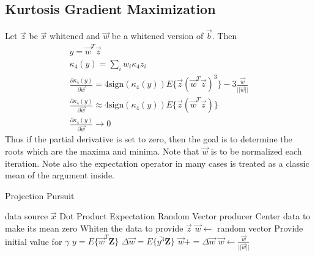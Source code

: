 \documentclass[12pt ]{article}
\begin{document}
\subsection{Kurtosis Gradient Maximization}
Let $\vec{z}$ be $\vec{x}$ whitened and $\vec{w}$ be a whitened version of $\vec{b}$.  Then 
\begin{eqnarray}
y = \vec{w}^T \vec{z} \\ 
\kappa_4 (y) = \sum _i w_i \kappa_4{z_i} \\
\frac{\partial \kappa _4 (y)} {\partial \vec{w}} = 4 \textrm{sign} (\kappa _4 (y))E\{ \vec{z} (\vec{w}^T \vec{z})^3\} - 3 \frac{\vec{w}}{||\vec{w}||}  \\
\frac{\partial \kappa _4 (y)} {\partial \vec{w}} \approx 4 \textrm{sign} (\kappa_4(y))E \{ \vec{z} (\vec{w}^T \vec{z}) \} \\
\frac{\partial \kappa _4 (y)} {\partial \vec{w}} \to 0 
\end{eqnarray}
Thus if the partial derivative is set to zero, then the goal is to determine the roots which are the maxima and minima.  Note that $\vec{w}$ is to be normalized each iteration.  Note also the expectation operator in many cases is treated as a classic mean of the argument inside.    



\begin{algorithm}
\caption{Projection Pursuit}
\label{alg:Projection-Pursuit}
\begin{algorithmic}
	\REQUIRE data source $\vec{x}$
	\REQUIRE Dot Product Expectation
	\REQUIRE Random Vector producer
	\STATE Center data to make its mean zero
	\STATE Whiten the data to provide $\vec{z}$
	\STATE $\vec{w} \leftarrow$ random vector
	\STATE Provide initial value for $\gamma$
	\REPEAT
		\STATE $y = E \{\vec{w}^T \mathbf{Z} \}$
		\STATE $ \Delta \vec{w} = E \{ \bar {y^3} \mathbf{Z}  \}   $
		\STATE $\vec{w} += \Delta \vec{w} $
		\STATE $\vec{w} \leftarrow \frac{\vec{w}}{||\vec{w}||}$
\end{algorithmic}
\end{algorithm}
\end{document}
